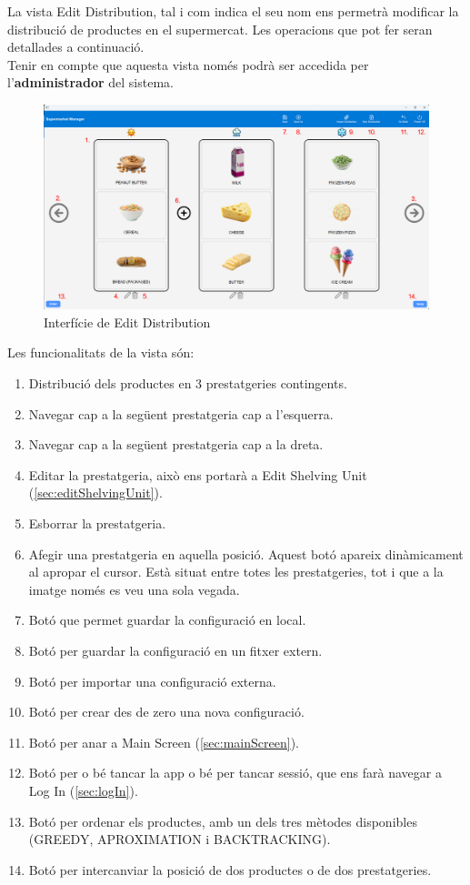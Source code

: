 \documentclass[a4paper,12pt]{article}
\begin{document}
	La vista Edit Distribution, tal i com indica el seu nom ens permetrà modificar la distribució de productes en el supermercat. Les operacions que pot fer seran detallades a continuació. \\
	
	Tenir en compte que aquesta vista només podrà ser accedida per l'\textbf{administrador} del sistema.
	
	\begin{figure}[H] 
		\centering
		\includegraphics[width=0.75\linewidth]{assets/editdistribution.png}
		\caption{Interfície de Edit Distribution}
	\end{figure}
	
	\noindent Les funcionalitats de la vista són:
	
	\begin{enumerate}[itemsep=0pt, topsep=0pt]
		\item Distribució dels productes en 3 prestatgeries contingents.
		\item Navegar cap a la següent prestatgeria cap a l'esquerra.
		\item Navegar cap a la següent prestatgeria cap a la dreta.
		\item Editar la prestatgeria, això ens portarà a Edit Shelving Unit (\ref{sec:editShelvingUnit}).
		\item Esborrar la prestatgeria.
		\item Afegir una prestatgeria en aquella posició. Aquest botó apareix dinàmicament al apropar el cursor. Està situat entre totes les prestatgeries, tot i que a la imatge només es veu una sola vegada.
		\item Botó que permet guardar la configuració en local.
		\item Botó per guardar la configuració en un fitxer extern.
		\item Botó per importar una configuració externa.
		\item Botó per crear des de zero una nova configuració.
		\item Botó per anar a Main Screen (\ref{sec:mainScreen}).
		\item Botó per o bé tancar la app o bé per tancar sessió, que ens farà navegar a Log In (\ref{sec:logIn}).
		\item Botó per ordenar els productes, amb un dels tres mètodes disponibles (GREEDY, APROXIMATION i BACKTRACKING).
		\item Botó per intercanviar la posició de dos productes o de dos prestatgeries.
	\end{enumerate}
	
\end{document}
